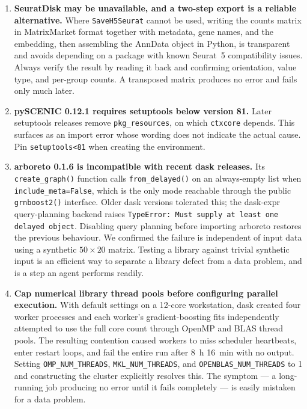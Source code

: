 \begin{enumerate}[leftmargin=*]
\item \textbf{SeuratDisk may be unavailable, and a two-step export is a reliable alternative.} Where \texttt{SaveH5Seurat} cannot be used, writing the counts matrix in MatrixMarket format together with metadata, gene names, and the embedding, then assembling the AnnData object in Python, is transparent and avoids depending on a package with known Seurat~5 compatibility issues. Always verify the result by reading it back and confirming orientation, value type, and per-group counts. A transposed matrix produces no error and fails only much later.


\item \textbf{pySCENIC 0.12.1 requires setuptools below version 81.} Later setuptools releases remove \texttt{pkg\_resources}, on which \texttt{ctxcore} depends. This surfaces as an import error whose wording does not indicate the actual cause. Pin \texttt{setuptools<81} when creating the environment.

\item \textbf{arboreto 0.1.6 is incompatible with recent dask releases.} Its \texttt{create\_graph()} function calls \texttt{from\_delayed()} on an always-empty list when \texttt{include\_meta=False}, which is the only mode reachable through the public \texttt{grnboost2()} interface. Older dask versions tolerated this; the dask-expr query-planning backend raises \texttt{TypeError: Must supply at least one delayed object}. Disabling query planning before importing arboreto restores the previous behaviour. We confirmed the failure is independent of input data using a synthetic $50 \times 20$ matrix. Testing a library against trivial synthetic input is an efficient way to separate a library defect from a data problem, and is a step an agent performs readily.

\item \textbf{Cap numerical library thread pools before configuring parallel execution.} With default settings on a 12-core workstation, dask created four worker processes and each worker's gradient-boosting fits independently attempted to use the full core count through OpenMP and BLAS thread pools. The resulting contention caused workers to miss scheduler heartbeats, enter restart loops, and fail the entire run after 8~h 16~min with no output. Setting \texttt{OMP\_NUM\_THREADS}, \texttt{MKL\_NUM\_THREADS}, and \texttt{OPENBLAS\_NUM\_THREADS} to 1 and constructing the cluster explicitly resolves this. The symptom --- a long-running job producing no error until it fails completely --- is easily mistaken for a data problem.


\end{enumerate}
